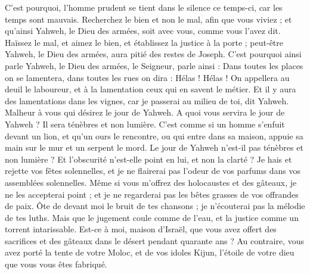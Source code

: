 \begin{multicols}{2}
C'est pourquoi, l'homme prudent se tient dans le silence ce temps-ci, car les temps sont mauvais.
Recherchez le bien et non le mal, afin que vous viviez ; et qu'ainsi Yahweh, le Dieu des armées, soit avec vous, comme vous l'avez dit.
Haïssez le mal, et aimez le bien, et établissez la justice à la porte ; peut-être Yahweh, le Dieu des armées, aura pitié des restes de Joseph.
C'est pourquoi ainsi parle Yahweh, le Dieu des armées, le Seigneur, parle ainsi : Dans toutes les places on se lamentera, dans toutes les rues on dira : Hélas ! Hélas ! On appellera au deuil le laboureur, et à la lamentation ceux qui en savent le métier.
Et il y aura des lamentations dans les vignes, car je passerai au milieu de toi, dit Yahweh.
Malheur à vous qui désirez le jour de Yahweh. A quoi vous servira le jour de Yahweh ? Il sera ténèbres et non  lumière.
C'est comme si un homme s'enfuit devant un lion, et qu'un ours le rencontre, ou qui entre dans sa maison, appuie sa main sur le mur et un serpent le mord.
Le jour de Yahweh n'est-il pas ténèbres et non lumière ? Et l'obscurité n'est-elle point en lui, et non la clarté ?
Je hais et rejette vos fêtes solennelles, et je ne flairerai pas l'odeur de vos parfums dans vos assemblées solennelles.
Même si vous m'offrez des holocaustes et des gâteaux, je ne les accepterai point ; et je ne regarderai pas les bêtes grasses de vos offrandes de paix.
Ôte de devant moi le bruit de tes chansons ; je n'écouterai pas la mélodie de tes luths.
Mais que le jugement coule comme de l'eau, et la justice comme un torrent intarissable.
Est-ce à moi, maison d'Israël, que vous avez offert des sacrifices et des gâteaux dans le désert pendant quarante ans ?
Au contraire, vous avez porté la tente de votre Moloc, et de vos idoles Kijun, l'étoile de votre dieu que vous vous êtes fabriqué.

\end{multicols}
